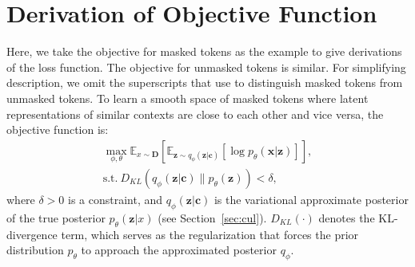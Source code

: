 \documentclass[11pt]{article}
\begin{document}
\section{Derivation of Objective Function} \label{app:loss}
Here, we take the objective for masked tokens as the example to give derivations of the loss function.
The objective for unmasked tokens is similar. For simplifying description, we omit  the superscripts that use to distinguish masked tokens from unmasked tokens.
To learn a smooth space of masked tokens where latent representations of similar contexts are close to each other and vice versa, the objective function is:
\begin{equation}
\begin{split}
    \max_{\phi, \theta} \mathbb{E}_{
    {x} \sim \mathbf{D}
    }[\mathbb{E}_{
    \mathbf{z} \sim q_{\phi}(\mathbf{z} | \mathbf{c})
    } 
    [\log p_\theta (\mathbf{x} | \mathbf{z})]],
    \\ 
    \text{s.t.} \ D_{KL}( 
            q_{\phi}(\mathbf{z} | \mathbf{c}) 
            \|
            p_{\theta}(\mathbf{z}))  < \delta,
\end{split}
\end{equation}
where $\delta>0$ is a constraint, and
$q_\phi(\mathbf{z} | \mathbf{c}) $ is the variational approximate posterior of the true posterior $p_{\theta}(\mathbf{z} | {x})$ (see Section~\ref{sec:cul}).
$D_{KL}(\cdot)$ denotes the KL-divergence term, which serves as the regularization that forces the prior distribution $p_{\theta}$ to approach the approximated posterior $q_{\phi}$.
\end{document}

